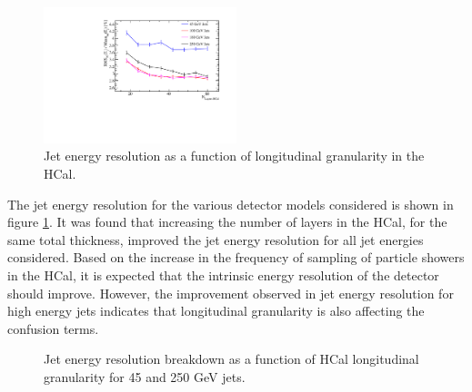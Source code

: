 \begin{figure}
\centering
\includegraphics[width=0.5\textwidth]{OptimisationStudies/Plots/JetEnergyResolutions/JER_vs_NumberOfLayersInTheHCal.pdf}
\caption[Jet energy resolution as a function of longitudinal granularity in the HCal.]{Jet energy resolution as a function of longitudinal granularity in the HCal.}
\label{fig:hcalnlayers}
\end{figure}

The jet energy resolution for the various detector models considered is shown in figure \ref{fig:hcalnlayers}.  It was found that increasing the number of layers in the HCal, for the same total thickness, improved the jet energy resolution for all jet energies considered.  Based on the increase in the frequency of sampling of particle showers in the HCal, it is expected that the intrinsic energy resolution of the detector should improve.  However, the improvement observed in jet energy resolution for high energy jets indicates that longitudinal granularity is also affecting the confusion terms.

\begin{figure}
\centering
{}
\caption[Jet energy resolution breakdown as a function of HCal longitudinal granularity for 45 and 250 GeV jets.]{Jet energy resolution breakdown as a function of HCal longitudinal granularity for 45 and 250 GeV jets.}
\label{fig:hcalnlayersbreak}
\end{figure}

